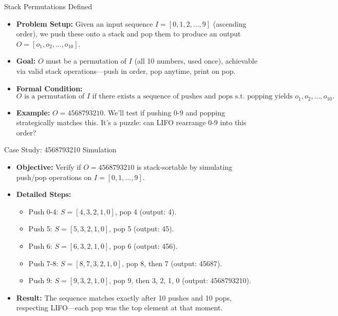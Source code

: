 \begin{frame}{Stack Permutations Defined}
    \begin{itemize}
        \item \textbf{Problem Setup:} Given an input sequence \( I = [0, 1, 2, ..., 9] \) (ascending order), we push these onto a stack and pop them to produce an output \( O = [o_1, o_2, ..., o_{10}] \).
        \item \textbf{Goal:} \( O \) must be a permutation of \( I \) (all 10 numbers, used once), achievable via valid stack operations—push in order, pop anytime, print on pop.
        \item \textbf{Formal Condition:}
        \[
        O \text{ is a permutation of } I \text{ if there exists a sequence of pushes and pops s.t. popping yields } o_1, o_2, ..., o_{10}.
        \]
        \item \textbf{Example:} \( O = 4568793210 \). We’ll test if pushing 0-9 and popping strategically matches this. It’s a puzzle: can LIFO rearrange 0-9 into this order?
    \end{itemize}
\end{frame}

\begin{frame}{Case Study: 4568793210 Simulation}
    \begin{itemize}
        \item \textbf{Objective:} Verify if \( O = 4568793210 \) is stack-sortable by simulating push/pop operations on \( I = [0, 1, ..., 9] \).
        \item \textbf{Detailed Steps:}
        \begin{itemize}
            \item Push 0-4: \( S = [4, 3, 2, 1, 0] \), pop 4 (output: 4).
            \item Push 5: \( S = [5, 3, 2, 1, 0] \), pop 5 (output: 45).
            \item Push 6: \( S = [6, 3, 2, 1, 0] \), pop 6 (output: 456).
            \item Push 7-8: \( S = [8, 7, 3, 2, 1, 0] \), pop 8, then 7 (output: 45687).
            \item Push 9: \( S = [9, 3, 2, 1, 0] \), pop 9, then 3, 2, 1, 0 (output: 4568793210).
        \end{itemize}
        \item \textbf{Result:} The sequence matches exactly after 10 pushes and 10 pops, respecting LIFO—each pop was the top element at that moment.
    \end{itemize}
\end{frame}

